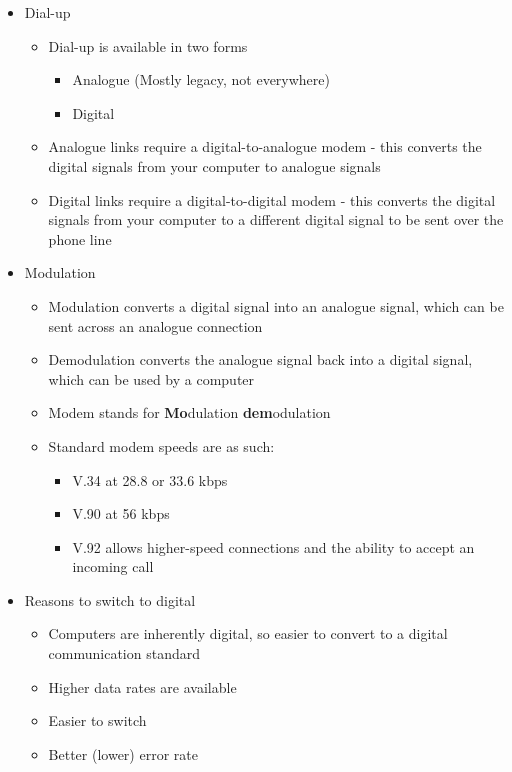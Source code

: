 \begin{itemize}
  \item Dial-up
  \begin{itemize}
    \item Dial-up is available in two forms
    \begin{itemize}
      \item Analogue (Mostly legacy, not everywhere)
      \item Digital
    \end{itemize}
    \item Analogue links require a digital-to-analogue modem - this converts the digital signals from your computer to analogue signals
    \item Digital links require a digital-to-digital modem - this converts the digital signals from your computer to a different digital signal to be sent over the phone line
  \end{itemize}
  \item Modulation
  \begin{itemize}
    \item Modulation converts a digital signal into an analogue signal, which can be sent across an analogue connection
    \item Demodulation converts the analogue signal back into a digital signal, which can be used by a computer
    \item Modem stands for \textbf{Mo}dulation \textbf{dem}odulation
    \item Standard modem speeds are as such:
    \begin{itemize}
      \item V.34 at 28.8 or 33.6 kbps
      \item V.90 at 56 kbps
      \item V.92 allows higher-speed connections and the ability to accept an incoming call
    \end{itemize}
  \end{itemize}
  \item Reasons to switch to digital
  \begin{itemize}
    \item Computers are inherently digital, so easier to convert to a digital communication standard
    \item Higher data rates are available
    \item Easier to switch
    \item Better (lower) error rate
    \begin{itemize}

\end{itemize}
\end{itemize}
\end{itemize}
